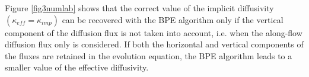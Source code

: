 \color{red}Figure \ref{fig3numlab} shows that the correct value of the implicit diffusivity $(\kappa_{eff}=\kappa_{imp})$ can be recovered with the BPE algorithm only if the vertical component of the diffusion flux is not taken into account, i.e. when the along-flow diffusion flux only is considered. \color{blue} If both the horizontal and vertical components of the fluxes are retained in the evolution equation, the BPE algorithm leads to a smaller value of the effective diffusivity.
\color{black}


